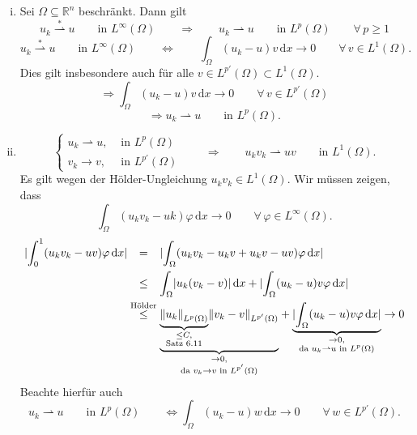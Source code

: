 \begin{bemerkung}
	\begin{enumerate}[(i)]
		\item Sei $\Omega \subseteq \mathbb{R}^n$ beschränkt. Dann gilt
		\[
			u_k \stackrel{*}{\rightharpoonup} u \qquad \text{in }L^{\infty}(\Omega) \qquad \Rightarrow \qquad  u_k \rightharpoonup u \qquad \text{in }L^p(\Omega) \qquad \forall\, p \geq 1
		\]
		\[
			u_k \stackrel{*}{\rightharpoonup} u \qquad \text{in }L^{\infty}(\Omega) \qquad \Leftrightarrow \qquad \int_{\Omega}^{}(u_k - u)v \,\mathrm{d}x \to 0 \qquad \forall\, v \in L^1(\Omega).
		\]
		Dies gilt insbesondere auch für alle $v \in L^{p'}(\Omega) \subset L^1(\Omega)$.
		\[
			\Rightarrow \int_{\Omega}^{} (u_k-u)v \,\mathrm{d}x \to 0 \qquad \forall\, v \in L^{p'}(\Omega)
		\]
		\[
			\Rightarrow u_k \rightharpoonup u \qquad \text{in }L^p(\Omega).
		\]
		\item 
		\[
			\begin{cases}
				u_k \rightharpoonup u, &\text{ in }L^p(\Omega)\\
				v_k \to v, &\text{ in }L^{p'}(\Omega)
			\end{cases} \qquad \Rightarrow \qquad  u_k v_k \rightharpoonup uv \qquad \text{in }L^1(\Omega).
		\]
		Es gilt wegen der Hölder-Ungleichung $u_kv_k \in L^1(\Omega)$. Wir müssen zeigen, dass 
		\[
			\int_{\Omega}^{}(u_kv_k-uk)\varphi \,\mathrm{d}x \to 0 \qquad \forall\, \varphi \in L^{\infty}(\Omega).
		\]
		\begin{align*}
			\abs{\int_{0}^{1}(u_kv_k-uv)\varphi \,\mathrm{d}x} &\stackrel{\hphantom{\text{Hölder}}}{=} \abs{\int_{\Omega}^{}(u_k v_k - u_k v+ u_k v - uv)\varphi \,\mathrm{d}x} \\
			&\stackrel{\hphantom{\text{Hölder}}}{\leq } \int_{\Omega}^{}\abs{u_k (v_k-v)} \,\mathrm{d}x + \abs{\int_{\Omega}^{}(u_k-u)v \varphi \,\mathrm{d}x} \\
			&\stackrel{\text{Hölder}}{\leq} \underset{\substack{\to 0, \\\text{da }v_k \to v \text{ in }L^{p'}(\Omega)}}{\underbrace{\underset{\substack{\leq C, \\\text{Satz }6.11}}{\underbrace{\norm{u_k}_{L^p(\Omega)}}} \norm{v_k-v}_{L^{p'}(\Omega)}}} + \underset{\substack{\to 0, \\\text{da }u_k \rightharpoonup u \text{ in }L^{p}(\Omega)}}{\underbrace{\abs{\int_{\Omega}^{} ( u_k - u )v \varphi \,\mathrm{d}x}}} \to 0 
		\end{align*}
		Beachte hierfür auch 
		\[
			u_k \rightharpoonup u \qquad \text{in }L^p(\Omega) \qquad \Leftrightarrow  \int_{\Omega}^{}(u_k - u)w \,\mathrm{d}x \to 0 \qquad \forall\, w \in L^{p'}(\Omega).
\]
\end{enumerate}
\end{bemerkung}
